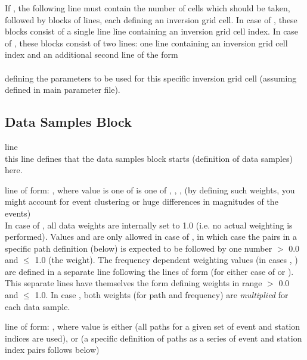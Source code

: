 If , the following line must contain the number of cells  
which should be taken, followed by  blocks of lines, each defining an inversion grid cell. In case
of , these blocks consist of a single line line containing an inversion grid cell index.
In case of , these blocks consist of two lines: one line containing an inversion grid cell
index and an additional second line of the form\\
 \\
defining the parameters to be used for this specific inversion grid cell (assuming  defined in main parameter file).

\subsection{Data Samples Block}
line \\
this line defines that the data samples block starts (definition of data samples) here. 

line of form: , where value is one of is one of , , 
,  (by defining such weights, you might account for event clustering or huge differences in magnitudes of the events) \\
In case of , all data weights are internally set to 1.0 (i.e. no actual weighting is performed).
Values  and  are only allowed in case of , in which case
the pairs  in a specific path definition (below) is expected to be followed by one number $>$ 0.0 and $\le$ 1.0 (the weight).
The frequency dependent weighting values (in cases , ) are defined
in a separate line following the lines of form  (for either case of 
or ). This separate lines have themselves the form  defining  weights
in range $>$ 0.0 and $\le$ 1.0. 
In case , both weights (for path and frequency) are \emph{multiplied} for each data sample.

line of form: , where value is either  (all paths for a given set of event and station indices
are used), or  (a specific definition of paths as a series of event and station index pairs follows below)

